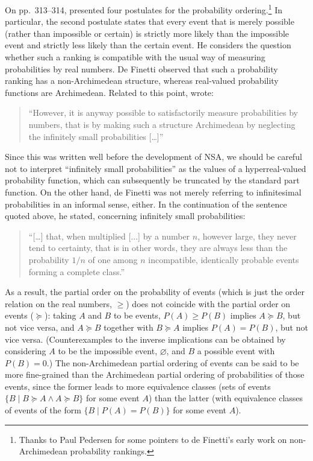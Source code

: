 On pp.~313--314, \citet[section~13]{deFinetti:1931} presented four postulates for the probability ordering.\footnote{Thanks to Paul Pedersen for some pointers to de Finetti's early work on non-Archimedean probability rankings.} In particular, the second postulate states that every event that is merely possible (rather than impossible or certain) is strictly more likely than the impossible event and strictly less likely than the certain event. He considers the question whether such a ranking is compatible with the usual way of measuring probabilities by real numbers. De Finetti observed that such a probability ranking has a non-Archimedean structure, whereas real-valued probability functions are Archimedean. Related to this point, \citet[p.~316]{deFinetti:1931} wrote:
\begin{quote}
``However, it is anyway possible to satisfactorily measure probabilities by numbers, that is by making such a structure Archimedean by neglecting the infinitely small probabilities [\ldots]''
\end{quote}
Since this was written well before the development of NSA, we should be careful not to interpret ``infinitely small probabilities'' as the values of a hyperreal-valued probability function, which can subsequently be truncated by the standard part function. On the other hand, de Finetti was not merely referring to infinitesimal probabilities in an informal sense, either. In the continuation of the sentence quoted above, he stated, concerning infinitely small probabilities:
\begin{quote}
``[\ldots] that, when multiplied [...] by a number $n$, however large, they never tend to certainty, that is in other words, they are always less than the probability $1/n$ of one among $n$ incompatible, identically probable events forming a complete class.''
\end{quote}
As a result, the partial order on the probability of events (which is just the order relation on the real numbers, $\geq$) does not coincide with the partial order on events ($\succeq$): taking $A$ and $B$ to be events, $P(A) \geq P(B)$ implies $A \succeq B$, but not vice versa, and $A \succeq B$ together with $B \succeq A$ implies $P(A) = P(B)$, but not vice versa. (Counterexamples to the inverse implications can be obtained by considering $A$ to be the impossible event, $\varnothing$, and $B$ a possible event with $P(B)=0$.) The non-Archimedean partial ordering of events can be said to be more fine-grained than the Archimedean partial ordering of probabilities of those events, since the former leads to more equivalence classes (sets of events $\{B \mid B \succeq A \wedge A \succeq B \}$ for some event $A$) than the latter (with equivalence classes of events of the form $\{B \mid P(A) = P(B) \}$ for some event $A$).

